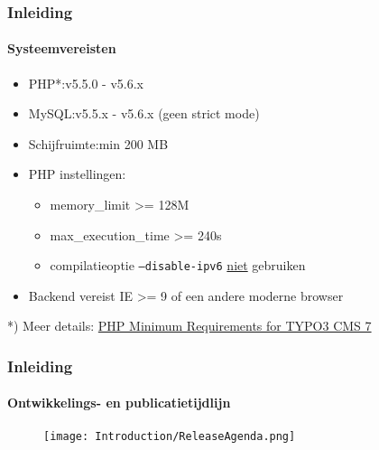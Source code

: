 \begin{frame}[fragile]
	\frametitle{Inleiding}
	\framesubtitle{Systeemvereisten}

	\begin{itemize}
		\item PHP*:\tabto{2.2cm}v5.5.0 - v5.6.x
		\item MySQL:\tabto{2.2cm}v5.5.x - v5.6.x (geen strict mode)
		\item Schijfruimte:\tabto{2.2cm}min 200 MB
		\item PHP instellingen:

			\begin{itemize}
				\item memory\_limit >= 128M
				\item max\_execution\_time >= 240s
				\item compilatieoptie \texttt{--disable-ipv6} \underline{niet} gebruiken
			\end{itemize}

		\item Backend vereist IE >= 9 of een andere moderne browser

	\end{itemize}

	\vspace{1cm}
	*) Meer details: \href{http://typo3.org/news/article/php-minimum-requirements-for-typo3-cms-7/}{PHP Minimum Requirements for TYPO3 CMS 7}

\end{frame}

\begin{frame}[fragile]
	\frametitle{Inleiding}
	\framesubtitle{Ontwikkelings- en publicatietijdlijn}

	\begin{figure}
		\texttt{[image: Introduction/ReleaseAgenda.png]}
	\end{figure}

\end{frame}

